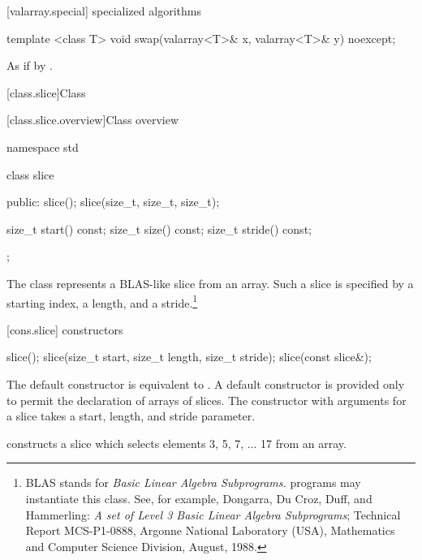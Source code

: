 [valarray.special]{ specialized algorithms}

%
\begin{itemdecl}
template <class T> void swap(valarray<T>& x, valarray<T>& y) noexcept;
\end{itemdecl}

\begin{itemdescr}
\pnum
\effects As if by .
\end{itemdescr}


[class.slice]{Class }

[class.slice.overview]{Class  overview}

%
\begin{codeblock}
namespace std {
  class slice {
  public:
    slice();
    slice(size_t, size_t, size_t);

    size_t start() const;
    size_t size() const;
    size_t stride() const;
  };
}
\end{codeblock}

\pnum
The
class represents a BLAS-like slice from an array.
Such a slice is specified by a starting index, a length, and a
stride.\footnote{BLAS stands for
\textit{Basic Linear Algebra Subprograms.}
\Cpp programs may instantiate this class.
See, for example,
Dongarra, Du Croz, Duff, and Hammerling:
\textit{A set of Level 3 Basic Linear Algebra Subprograms};
Technical Report MCS-P1-0888,
Argonne National Laboratory (USA),
Mathematics and Computer Science Division,
August, 1988.}

[cons.slice]{ constructors}

%
\begin{itemdecl}
slice();
slice(size_t start, size_t length, size_t stride);
slice(const slice&);
\end{itemdecl}

\begin{itemdescr}
\pnum
The default constructor is equivalent to .
A default constructor is provided only to permit the declaration of arrays of slices.
The constructor with arguments for a slice takes a start, length, and stride
parameter.

\pnum
\begin{example}
constructs a slice which selects elements 3, 5, 7, ... 17 from an array.
\end{example}
\end{itemdescr}


